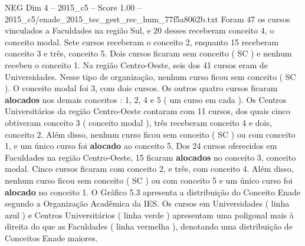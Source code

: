 \begin{textsample}{NEG Dim 4 – 2015\_c5 – Score 1.00 – 2015\_c5/enade\_2015\_tec\_gest\_rec\_hum\_77f5a8062b.txt}
Foram 47 os cursos vinculados a Faculdades na região Sul, e 20 desses receberam conceito 4, o conceito modal.
Sete cursos receberam o conceito 2, enquanto 15 receberam conceito 3 e três, conceito 5.
Dois cursos ficaram sem conceito ( SC ) e nenhum recebeu o conceito 1.
Na região Centro-Oeste, seis dos 41 cursos eram de Universidades.
Nesse tipo de organização, nenhum curso ficou sem conceito ( SC ).
O conceito modal foi 3, com dois cursos.
Os outros quatro cursos ficaram \textbf{alocados} nos demais conceitos : 1, 2, 4 e 5 ( um curso em cada ).
Os Centros Universitários da região Centro-Oeste contaram com 11 cursos, dos quais cinco obtiveram conceito 3 ( conceito modal ), três receberam conceito 4 e dois, conceito 2.
Além disso, nenhum curso ficou sem conceito ( SC ) ou com conceito 1, e um único curso foi \textbf{alocado} ao conceito 5.
Dos 24 cursos oferecidos em Faculdades na região Centro-Oeste, 15 ficaram \textbf{alocados} no conceito 3, conceito modal.
Cinco cursos ficaram com conceito 2, e três, com conceito 4.
Além disso, nenhum curso ficou sem conceito ( SC ) ou com conceito 5 e um único curso foi \textbf{alocado} no conceito 1.
O Gráfico 5.3 apresenta a distribuição do Conceito Enade segundo a Organização Acadêmica da IES.
Os cursos em Universidades ( linha azul ) e Centros Universitários ( linha verde ) apresentam uma poligonal mais à direita do que as Faculdades ( linha vermelha ), denotando uma distribuição de Conceitos Enade maiores.

\end{textsample}
